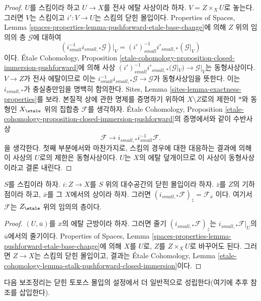\begin{proof}
$U$를 스킴이라 하고 $U \to X$를 전사 에탈 사상이라 하자.
$V = Z \times_X U$로 놓는다. 그러면 $V$는 스킴이고
$i' : V \to U$는 스킴의 닫힌 몰입이다. Properties of Spaces,
Lemma \ref{spaces-properties-lemma-pushforward-etale-base-change}에 의해
$Z$ 위의 임의의 층 $\mathcal{G}$에 대하여
$$
(i_{small}^{-1}i_{small, *}\mathcal{G})|_V =
(i')_{small}^{-1}i'_{small, *}(\mathcal{G}|_V)
$$
이다. \'Etale Cohomology, Proposition
\ref{etale-cohomology-proposition-closed-immersion-pushforward}에 의해
사상
$(i')_{small}^{-1}i'_{small, *}(\mathcal{G}|_V) \to \mathcal{G}|_V$는
동형사상이다. $V \to Z$가 전사 에탈이므로 이는
$i_{small}^{-1}i_{small, *}\mathcal{G} \to \mathcal{G}$가
동형사상임을 뜻한다. 이는 $i_{small, *}$가 충실충만임을 명백히
함의한다. Sites, Lemma \ref{sites-lemma-exactness-properties}를 보라.
본질적 상에 관한 명제를 증명하기 위하여 $X \setminus Z$로의 제한이
$*$와 동형인 $X_\etale$ 위의 집합층 $\mathcal{F}$를 생각하자.
\'Etale Cohomology, Proposition
\ref{etale-cohomology-proposition-closed-immersion-pushforward}의
증명에서와 같이 수반사상
$$
\mathcal{F} \longrightarrow i_{small, *}i_{small}^{-1}\mathcal{F}.
$$
을 생각한다. 첫째 부분에서와 마찬가지로, 스킴의 경우에 대한
대응하는 결과에 의해 이 사상의 $U$로의 제한은 동형사상이다.
$U$는 $X$의 에탈 덮개이므로 이 사상이 동형사상이라고 결론 내린다.
\end{proof}

\begin{lemma}
\label{lemma-stalk-push-closed}
$S$를 스킴이라 하자. $i : Z \to X$를 $S$ 위의 대수공간의
닫힌 몰입이라 하자. $\overline{z}$를 $Z$의 기하점이라 하고,
$\overline{x}$를 그 $X$에서의 상이라 하자. 그러면
$(i_{small, *}\mathcal{F})_{\overline{z}} = \mathcal{F}_{\overline{x}}$
이다. 여기서 $\mathcal{F}$는 $Z_\etale$ 위의 임의의 층이다.
\end{lemma}

\begin{proof}
$(U, \overline{u})$를 $\overline{x}$의 에탈 근방이라 하자.
그러면 줄기 $(i_{small, *}\mathcal{F})_{\overline{z}}$는
$i_{small, *}\mathcal{F}|_U$의 $\overline{u}$에서의 줄기이다.
Properties of Spaces, Lemma
\ref{spaces-properties-lemma-pushforward-etale-base-change}에 의해
$X$를 $U$로, $Z$를 $Z \times_X U$로 바꾸어도 된다.
그러면 $Z \to X$는 스킴의 닫힌 몰입이고, 결과는
\'Etale Cohomology, Lemma
\ref{etale-cohomology-lemma-stalk-pushforward-closed-immersion}이다.
\end{proof}

\noindent
다음 보조정리는 닫힌 토포스 몰입의 설정에서 더 일반적으로
성립한다(여기에 추후 참조를 삽입한다).

